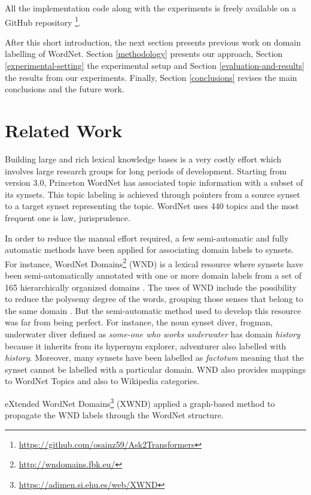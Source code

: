 \documentclass[11pt]{article}
\begin{document}
All the implementation code along with the experiments is freely available on a GitHub repository \footnote{\url{https://github.com/osainz59/Ask2Transformers}}.

After this short introduction, the next section presents previous work on domain labelling of WordNet. Section \ref{methodology} presents our approach, Section \ref{experimental-setting} the experimental setup and Section \ref{evaluation-and-results} the results from our experiments. Finally, Section \ref{conclusions} revises the main conclusions and the future work.

\section{Related Work}
\label{related-work}

Building large and rich lexical knowledge bases is a very costly effort which involves large research groups for long periods of development. Starting from version 3.0, Princeton WordNet has associated topic information with a subset of its synsets. This topic labeling is achieved through pointers from a source synset to a target synset representing the topic. WordNet uses 440 topics and the most frequent one is law, jurisprudence. 

In order to reduce the manual effort required, a few semi-automatic and fully automatic methods have been applied for associating domain labels to synsets. For instance, WordNet Domains\footnote{\url{http://wndomains.fbk.eu/}} (WND) is a lexical resource where synsets have been semi-automatically annotated with one or more domain labels from a set of 165 hierarchically organized domains \cite{magnini2000g, bentivogli2004revising}. The uses of WND include the possibility to reduce the polysemy degree of the words, grouping those senses that belong to the same domain \cite{magnini2002role}. But the semi-automatic method used to develop this resource was far from being perfect. For instance, the noun synset diver, frogman, underwater diver defined as {\it some-one who works underwater} has domain {\it history} because it inherits from its hypernym explorer, adventurer also labelled with {\it history}. Moreover, many synsets have been labelled as {\it factotum} meaning that the synset cannot be labelled with a particular domain. WND also provides mappings to WordNet Topics and also to Wikipedia categories.

eXtended WordNet Domains\footnote{\url{https://adimen.si.ehu.es/web/XWND}} (XWND) \cite{gonzalez2012proposal,gonzalez2012graph} applied a graph-based method to propagate the WND labels through the WordNet structure.
\end{document}
